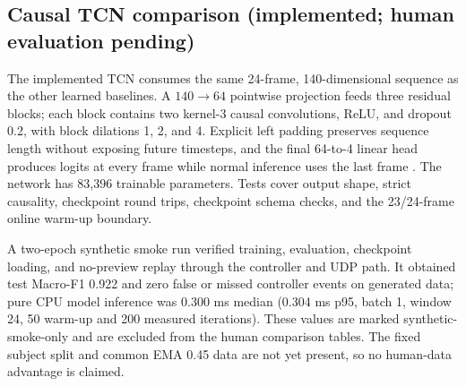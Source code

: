 \documentclass{article}
\newif\ifdraftnotes
\newcommand{\workitem}[7]{%
  \ifdraftnotes
  \begin{tcolorbox}[title={#1},title after break={#1 (continued)}]
  \textbf{Owner: }#2\par
  \textbf{Task: }#3\par
  \textbf{Protocol: }#4\par
  \textbf{Deliverables: }#5\par
  \textbf{Fill here: }#6\par
  \textbf{Done when: }#7
  \end{tcolorbox}
  \fi}
\newcommand{\code}[1]{\texttt{\detokenize{#1}}}
\begin{document}
\subsection{Causal TCN comparison (implemented; human evaluation pending)}\label{sec:tcn}
The implemented TCN consumes the same 24-frame, 140-dimensional sequence as the
other learned baselines. A $140\rightarrow64$ pointwise projection feeds three
residual blocks; each block contains two kernel-3 causal convolutions, ReLU, and
dropout 0.2, with block dilations 1, 2, and 4. Explicit left padding preserves
sequence length without exposing future timesteps, and the final 64-to-4 linear
head produces logits at every frame while normal inference uses the last frame
\citep{bai2018}.
The network has 83,396 trainable parameters. Tests cover output shape, strict
causality, checkpoint round trips, checkpoint schema checks, and the 23/24-frame
online warm-up boundary.

A two-epoch synthetic smoke run verified training, evaluation, checkpoint loading,
and no-preview replay through the controller and UDP path. It obtained test
Macro-F1 0.922 and zero false or missed controller events on generated data; pure
CPU model inference was 0.300 ms median (0.304 ms p95, batch 1, window 24, 50 warm-up
and 200 measured iterations). These values are marked synthetic-smoke-only and are
excluded from the human comparison tables. The fixed subject split and common EMA
0.45 data are not yet present, so no human-data advantage is claimed.

\workitem{M3 | Complete the causal TCN experiment; defer the Transformer}
{C (Caleb); implementation is complete and formal runs depend on A's split and D's shared EMA data. Use the same evaluation scripts as B.}
{Run the fixed TCN through the formal three-seed protocol. Train/evaluate/track/replay already accept \code{tcn}, and checkpoint validation preserves the existing MLP/GRU format.}
{Keep the implemented 140-to-64 projection, three residual blocks with two causal kernel-3 convolutions each, dilation 1/2/4, ReLU, dropout 0.2, and the four-class head. Do not tune on test data. Use the same visible history, training budget, shared controller, and EMA 0.45 inputs as the other baselines.}
{Configuration, code version, parameter count, three-seed checkpoints and evaluation results. Automated preflight rejects synthetic or unverified recordings, subject leakage, incomplete training labels, and a mismatched preprocessing manifest.}
{Replace the planned description with the final architecture and supporting citation. Complete Tables~\ref{tab:recognition} and~\ref{tab:events}; discuss accuracy alongside parameter count and time, rather than selecting only the highest score.}
{Basic validation by Wednesday, Oct. 21; results by Thursday, Oct. 22. If unfinished, retain planned status and missing values without blocking the three existing baselines.}
\end{document}

